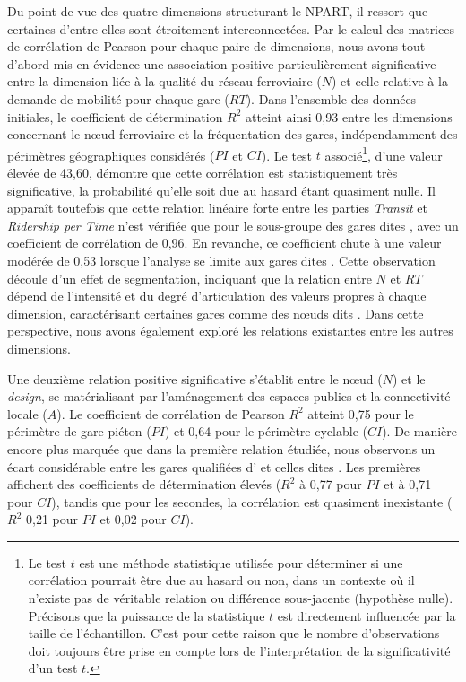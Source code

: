 \begin{refsegment}
Du point de vue des quatre dimensions structurant le \acrshort{NPART}, il ressort que certaines d'entre elles sont étroitement interconnectées. Par le calcul des matrices de corrélation de Pearson pour chaque paire de dimensions, nous avons tout d’abord mis en évidence une association positive particulièrement significative entre la dimension liée à la qualité du réseau ferroviaire (\(N\)) et celle relative à la demande de mobilité pour chaque gare (\(RT\)). Dans l’ensemble des données initiales, le coefficient de détermination \(R^2\) atteint ainsi 0,93 entre les dimensions concernant le nœud ferroviaire et la fréquentation des gares, indépendamment des périmètres géographiques considérés (\(PI\) et \(CI\)). Le test \(t\) associé\footnote{
    Le test \(t\) est une méthode statistique utilisée pour déterminer si une corrélation pourrait être due au hasard ou non, dans un contexte où il n'existe pas de véritable relation ou différence sous-jacente (hypothèse nulle). Précisons que la puissance de la statistique \(t\) est directement influencée par la taille de l'échantillon. C'est pour cette raison que le nombre d'observations doit toujours être prise en compte lors de l'interprétation de la significativité d'un test \(t\).
}, d’une valeur élevée de 43,60, démontre que cette corrélation est statistiquement très significative, la probabilité qu’elle soit due au hasard étant quasiment nulle. Il apparaît toutefois que cette relation linéaire forte entre les parties \textsl{Transit} et \textsl{Ridership per Time} n’est vérifiée que pour le sous-groupe des gares dites , avec un coefficient de corrélation de 0,96. En revanche, ce coefficient chute à une valeur modérée de 0,53 lorsque l’analyse se limite aux gares dites . Cette observation découle d'un effet de segmentation, indiquant que la relation entre \(N\) et \(RT\) dépend de l’intensité et du degré d’articulation des valeurs propres à chaque dimension, caractérisant certaines gares comme des nœuds dits . Dans cette perspective, nous avons également exploré les relations existantes entre les autres dimensions.%

Une deuxième relation positive significative s'établit entre le nœud (\(N\)) et le \textit{design}, se matérialisant par l’aménagement des espaces publics et la connectivité locale (\(A\)). Le coefficient de corrélation de Pearson \(R^2\) atteint 0,75 pour le périmètre de gare piéton (\(PI\)) et 0,64 pour le périmètre cyclable (\(CI\)). De manière encore plus marquée que dans la première relation étudiée, nous observons un écart considérable entre les gares qualifiées d’ et celles dites . Les premières affichent des coefficients de détermination élevés (\(R^2\) à 0,77 pour \(PI\) et à 0,71 pour \(CI\)), tandis que pour les secondes, la corrélation est quasiment inexistante (\(R^2\) 0,21 pour \(PI\) et 0,02 pour \(CI\)).%


\end{refsegment}

